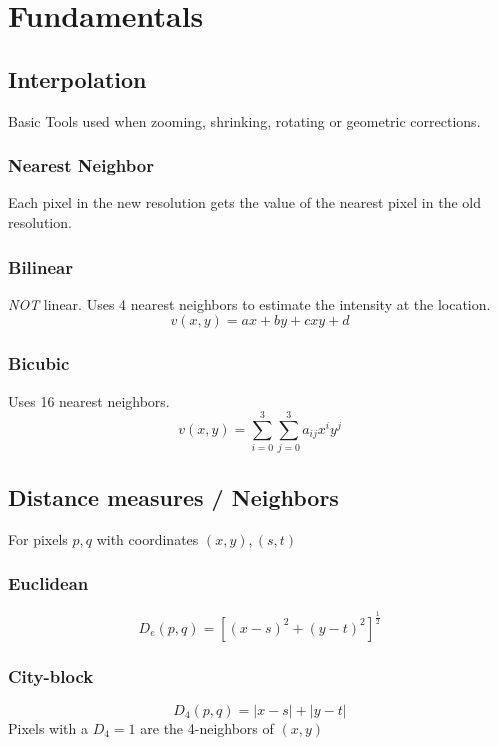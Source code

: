 \section{Fundamentals }

\subsection{Interpolation}
Basic Tools used when zooming, shrinking, rotating or geometric corrections.

\subsubsection{Nearest Neighbor}
Each pixel in the new resolution gets the value of the nearest pixel in the old resolution.

\subsubsection{Bilinear}
\emph{NOT} linear. Uses 4 nearest neighbors to estimate the intensity at the location.
\begin{equation}
v(x,y) = ax + by + cxy + d
\end{equation}

\subsubsection{Bicubic}
Uses 16 nearest neighbors.
\begin{equation}
v(x,y) = \sum_{i=0}^{3}\sum_{j=0}^{3}a_{ij}x^iy^j
\end{equation}

\subsection{Distance measures / Neighbors}
For pixels $p,q$  with coordinates $(x,y), (s,t)$
\subsubsection{Euclidean}
\begin{equation}
D_e(p,q) = [(x-s)^2 + (y-t)^2]^{\frac{1}{2}}
\end{equation}
\subsubsection{City-block}
\begin{equation}
D_4(p,q) = |x-s| + |y-t|
\end{equation}
Pixels with a $D_4 = 1$ are the 4-neighbors of $(x,y)$
